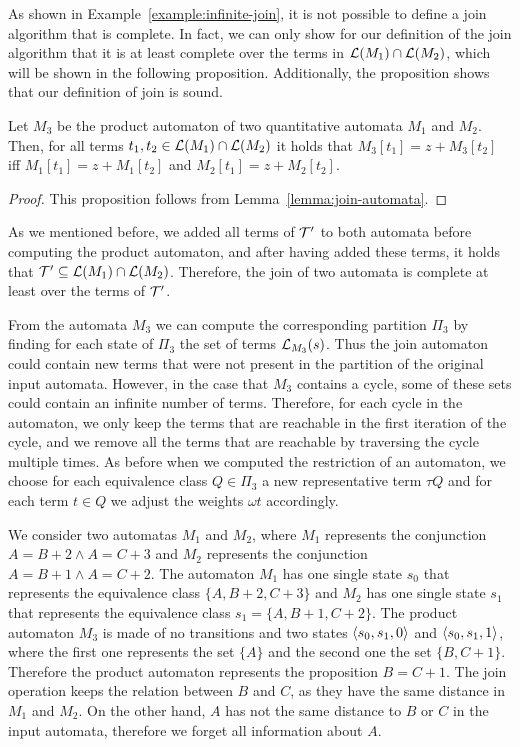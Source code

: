As shown in Example~\ref{example:infinite-join}, it is not possible to define a join algorithm that is complete.
In fact, we can only show for our definition of the join algorithm that it is at least complete over the terms in $\mathcal{L}(M_1) \cap \mathcal{L}(M_2)$, which will be shown in the following proposition.
Additionally, the proposition shows that our definition of join is sound.

\begin{proposition}\label{prop:join-automata}
    Let $M_3$ be the product automaton of two quantitative automata $M_1$ and $M_2$.
    Then, for all terms $t_1, t_2 \in \mathcal{L}(M_1) \cap \mathcal{L}(M_2)$ it holds that $M_3[t_1] = z + M_3[t_2]$ iff $M_1[t_1] = z + M_1[t_2]$ and $M_2[t_1] = z + M_2[t_2]$.
\end{proposition}
\begin{proof}
    This proposition follows from Lemma~\ref{lemma:join-automata}.
\end{proof}

As we mentioned before, we added all terms of $\mathcal{T}'$ to both automata before computing the product automaton, and after having added these terms, it holds that $\mathcal{T}' \subseteq \mathcal{L}(M_1) \cap \mathcal{L}(M_2)$.
Therefore, the join of two automata is complete at least over the terms of $\mathcal{T}'$.

From the automata $M_3$ we can compute the corresponding partition $\Pi_3$ by finding for each state of $\Pi_3$ the set of terms $\mathcal{L}_{M_3}(s)$.
Thus the join automaton could contain new terms that were not present in the partition of the original input automata.
However, in the case that $M_3$ contains a cycle, some of these sets could contain an infinite number of terms.
Therefore, for each cycle in the automaton, we only keep the terms that are reachable in the first iteration of the cycle, and we remove all the terms that are reachable by traversing the cycle multiple times.
As before when we computed the restriction of an automaton, we choose for each equivalence class $Q\in \Pi_3$ a new representative term $\tau Q$ and for each term $t \in Q$ we adjust the weights $\omega t$ accordingly.

\begin{example}
    We consider two automatas $M_1$ and $M_2$, where $M_1$ represents the conjunction $A = B + 2 \land A = C + 3$ and $M_2$ represents the conjunction $A = B + 1 \land A = C + 2$.
    The automaton $M_1$ has one single state $s_0$ that represents the equivalence class $\{A, B+2, C+3\}$
    and $M_2$ has one single state $s_1$ that represents the equivalence class $s_1 = \{A, B+1, C+2\}$.
    The product automaton $M_3$ is made of no transitions and two states $\langle s_0, s_1, 0\rangle$ and $\langle s_0, s_1, 1\rangle$, where the first one represents the set $\{A\}$ and the second one the set $\{B, C+1\}$.
    Therefore the product automaton represents the proposition $B = C + 1$.
    The join operation keeps the relation between $B$ and $C$, as they have the same distance in $M_1$ and $M_2$.
    On the other hand, $A$ has not the same distance to $B$ or $C$ in the input automata, therefore we forget all information about $A$.
\end{example}

